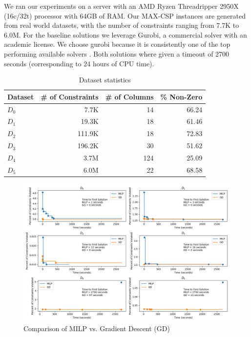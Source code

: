 \documentclass[a4paper]{article}
\begin{document}
We ran our experiments on a server with an AMD Ryzen Threadripper 2950X (16c/32t) processor with 
64GB of RAM. Our MAX-CSP instances are generated from real world datasets, with the number of constraints 
ranging from 7.7K to 6.0M. For the baseline solutions we 
leverage Gurobi, a commercial solver with an academic license. We choose gurobi because it is consistently 
one of the top performing available solvers \cite{benchmark}. Both solutions where given a timeout of 2700 seconds 
(corresponding to 24 hours of CPU time).
\begin{table}[ht!]
\caption{Dataset statistics}
\begin{tabular}{|l|r|r|r|}
\toprule
Dataset &  \# of Constraints &  \# of Columns &  \% Non-Zero \\
\midrule
         $D_0$ &                   7.7K &                 14 &         66.24 \\
         $D_1$ &                  19.3K &                 18 &         61.46 \\
         $D_2$ &                 111.9K &                 18 &         72.83 \\
         $D_3$ &                 196.2K &                 30 &         51.62 \\
         $D_4$ &                3.7M    &                124 &         25.09 \\
         $D_5$ &                6.0M    &                 22 &         68.58 \\
\bottomrule
\end{tabular}
\end{table}


\begin{figure}[ht!]
	\caption{Comparison of MILP vs. Gradient Descent (GD)}
	\includegraphics[width=\textwidth]{./time_series.png}
\end{figure}
\end{document}
